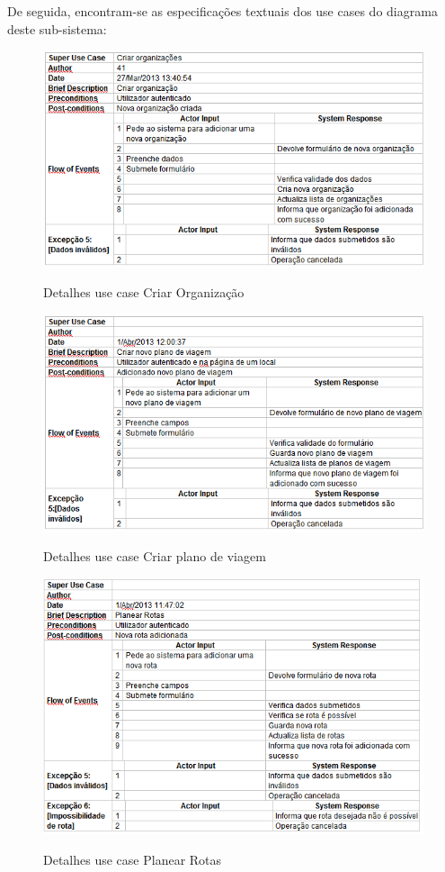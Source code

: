 \documentclass[12pt,a4paper]{article}
\begin{document}
De seguida, encontram-se as especificações textuais dos use cases do diagrama deste sub-sistema:\\

\begin{figure}[h!]
\centering
\includegraphics[scale=0.7]{d_usecase/criarorganizacao}
\label{usecase}
\caption{Detalhes use case Criar Organização}
\end{figure}

\begin{figure}[h!]
\centering
\includegraphics[scale=0.7]{d_usecase/criarviagem}
\label{usecase}
\caption{Detalhes use case Criar plano de viagem}
\end{figure}

\begin{figure}[h!]
\centering
\includegraphics[scale=0.7]{d_usecase/planearrota}
\label{usecase}
\caption{Detalhes use case Planear Rotas}
\end{figure}
\end{document}

